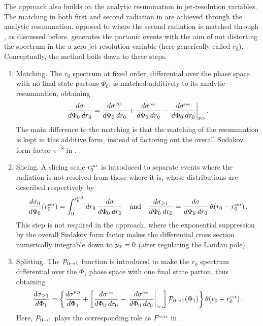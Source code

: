 \documentclass[11pt,a4paper]{article}
\begin{document}
The \GENEVA{} approach also builds on the analytic resummation in 
jet-resolution variables. The matching in both first 
and second radiation in \GENEVA{} are achieved through the 
analytic resummation, opposed to \minnlo{} where the second 
radiation is matched through \POWHEG{}, as discussed before.
\GENEVA{} generates the partonic events with the aim of not distorting
the spectrum in the a zero-jet resolution variable (here generically called $r_0$).
Conceptually, the \GENEVA{} method boils down to three steps.
\begin{enumerate}
\item Matching. The $r_0$ spectrum at fixed order, differential over
  the phase space with no final state partons $\Phi_0$, is matched
  additively to its analytic resummation, obtaining
  \begin{equation}
    \frac{d\sigma}{d\Phi_0 \> dr_0} =
    \frac{d\sigma^{\scriptscriptstyle\rm FO}}{d\Phi_0 \> dr_0} +
    \frac{d\sigma^{\scriptscriptstyle\rm res}}{d\Phi_0 \> dr_0} -
    \left. \frac{d\sigma^{\scriptscriptstyle\rm res}}{d\Phi_0 \>
      dr_0}\right|_{\scriptscriptstyle\rm FO}.
  \end{equation}
  The main difference to the \minnlo{} matching is that the 
  matching of the resummation is kept in this additive form, instead 
  of factoring out the overall Sudakov form factor $e^{-\tilde{S}}$ in .
\item Slicing. A slicing scale $r_0^{\scriptscriptstyle\rm cut}$ is
  introduced to separate events where the radiation is not resolved
  from those where it is, whose distributions are described
  respectively by
  \begin{equation}
    \frac{d\sigma_0}{d\Phi_0}\!\left(r_0^{\scriptscriptstyle\rm
      cut}\right) = \int_0^{r_0^{\scriptscriptstyle\rm cut}} dr_0 \>
    \frac{d\sigma}{d\Phi_0 \> dr_0}
    \quad \mbox{and} \quad
    \frac{d\sigma_{\geq 1}}{d\Phi_0 \> dr_0} = \frac{d\sigma}{d\Phi_0
      \> dr_0} \> \theta\!\left(r_0 - r_0^{\scriptscriptstyle\rm
      cut}\right).
  \end{equation}
  This step is not required in the \minnlo{} approach, where the
  exponential suppression  by the overall Sudakov form
  factor makes the differential cross section numerically integrable
  down to $p_{\scriptscriptstyle\rm T} = 0$ (after regulating the Landau
  pole).
\item Splitting. The ${\cal P}_{0 \to 1}$ function is introduced to
  make the $r_0$ spectrum differential over the $\Phi_1$ phase space
  with one final state parton, thus obtaining
  \begin{equation}
    \frac{d\sigma_{\geq 1}}{d\Phi_1} =
    \left\{\frac{d\sigma^{\scriptscriptstyle\rm FO}}{d\Phi_1} +
    \left[\frac{d\sigma^{\scriptscriptstyle\rm res}}{d\Phi_0 \> dr_0}
      - \left. \frac{d\sigma^{\scriptscriptstyle\rm res}}{d\Phi_0 \>
        dr_0}\right|_{\scriptscriptstyle\rm FO} \right] {\cal P}_{0
      \to 1}\!\left(\Phi_1\right)\right\} \theta\!\left(r_0 -
    r_0^{\scriptscriptstyle\rm cut}\right).
  \end{equation}
  Here, ${\cal P}_{0 \to 1}$ plays the corresponding role as
  $F^{\scriptscriptstyle\rm corr}$ in
  .
\end{enumerate}
\end{document}
